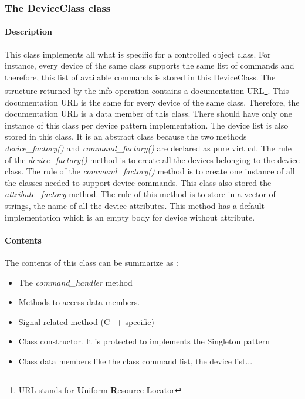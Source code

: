 \subsubsection{The DeviceClass class}

\paragraph{Description}

This class implements all what is specific for a controlled object
class. For instance, every device of the same class supports the same
list of commands and therefore, this list of available
commands is stored in this DeviceClass. The structure returned by
the info operation contains a documentation URL\footnote{URL stands for \textbf{U}niform \textbf{R}esource \textbf{L}ocator}.
This documentation URL is the same
for every device of the same class. Therefore, the documentation URL
is a data member of this class. There should have only one instance
of this class per device pattern implementation. The device list is
also stored in this class. It is an abstract class because the two
methods \emph{device\_factory()} and \emph{command\_factory()}
are declared as pure virtual. The rule of the \emph{device\_factory()}
method is to create all the devices belonging to the device class.
The rule of the \emph{command\_factory()} method is to create one
instance of all the classes needed to support device commands. This
class also stored the \emph{attribute\_factory}
method. The rule of this method is to store in a vector of strings,
the name of all the device attributes. This method has a default implementation
which is an empty body for device without attribute.

\paragraph{Contents}

The contents of this class can be summarize as :
\begin{itemize}
\item The \emph{command\_handler} method
\item Methods to access data members.
\item Signal related method (C++ specific)
\item Class constructor. It is protected to implements the Singleton pattern
\item Class data members like the class command list, the device list...
\end{itemize}

